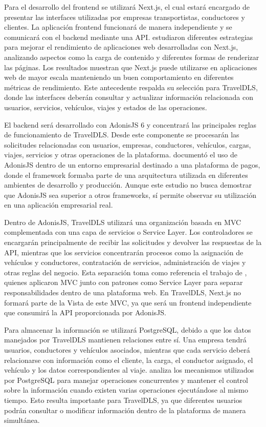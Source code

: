 Para el desarrollo del frontend se utilizará Next.js, el cual estará encargado de presentar las interfaces utilizadas por empresas transportistas, conductores y clientes. La aplicación frontend funcionará de manera independiente y se comunicará con el backend mediante una API. \textcite{savenko2025nextjs} estudiaron diferentes estrategias para mejorar el rendimiento de aplicaciones web desarrolladas con Next.js, analizando aspectos como la carga de contenido y diferentes formas de renderizar las páginas. Los resultados muestran que Next.js puede utilizarse en aplicaciones web de mayor escala manteniendo un buen comportamiento en diferentes métricas de rendimiento. Este antecedente respalda su selección para TravelDLS, donde las interfaces deberán consultar y actualizar información relacionada con usuarios, servicios, vehículos, viajes y estados de las operaciones.

El backend será desarrollado con AdonisJS 6 y concentrará las principales reglas de funcionamiento de TravelDLS. Desde este componente se procesarán las solicitudes relacionadas con usuarios, empresas, conductores, vehículos, cargas, viajes, servicios y otras operaciones de la plataforma. \textcite{bhatnagar2026adonisjs} documentó el uso de AdonisJS dentro de un entorno empresarial destinado a una plataforma de pagos, donde el framework formaba parte de una arquitectura utilizada en diferentes ambientes de desarrollo y producción. Aunque este estudio no busca demostrar que AdonisJS sea superior a otros frameworks, sí permite observar su utilización en una aplicación empresarial real.

Dentro de AdonisJS, TravelDLS utilizará una organización basada en MVC complementada con una capa de servicios o Service Layer. Los controladores se encargarán principalmente de recibir las solicitudes y devolver las respuestas de la API, mientras que los servicios concentrarán procesos como la asignación de vehículos y conductores, contratación de servicios, administración de viajes y otras reglas del negocio. Esta separación toma como referencia el trabajo de \textcite{arce2026mvc}, quienes aplicaron MVC junto con patrones como Service Layer para separar responsabilidades dentro de una plataforma web. En TravelDLS, Next.js no formará parte de la Vista de este MVC, ya que será un frontend independiente que consumirá la API proporcionada por AdonisJS.

Para almacenar la información se utilizará PostgreSQL, debido a que los datos manejados por TravelDLS mantienen relaciones entre sí. Una empresa tendrá usuarios, conductores y vehículos asociados, mientras que cada servicio deberá relacionarse con información como el cliente, la carga, el conductor asignado, el vehículo y los datos correspondientes al viaje. \textcite{kalay2025postgresql} analiza los mecanismos utilizados por PostgreSQL para manejar operaciones concurrentes y mantener el control sobre la información cuando existen varias operaciones ejecutándose al mismo tiempo. Esto resulta importante para TravelDLS, ya que diferentes usuarios podrán consultar o modificar información dentro de la plataforma de manera simultánea.

